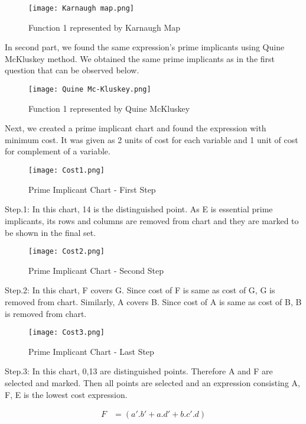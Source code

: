 \documentclass[pdftex,12pt,a4paper]{article}
\begin{document}
\begin{figure}[ht]
	\centering
	\texttt{[image: Karnaugh map.png]}
	\caption{Function 1 represented by Karnaugh Map}
	\label{fig1}
\end{figure}

In second part, we found the same expression's prime implicants using Quine McKluskey method. We obtained the same prime implicants as in the first question that can be observed below.

\begin{figure}[ht]
	\centering
	\texttt{[image: Quine Mc-Kluskey.png]}
	\caption{Function 1 represented by Quine McKluskey}
	\label{fig1}
\end{figure}

Next, we created a prime implicant chart and found the expression with minimum cost. It was given as 2 units of cost for each variable and 1 unit of cost for complement of a variable. 

\begin{figure}[ht]
	\centering
	\texttt{[image: Cost1.png]}
	\caption{Prime Implicant Chart - First Step}
	\label{fig1}
\end{figure}

Step.1: In this chart, 14 is the distinguished point. As E is essential prime implicants, its rows and columns are removed from chart and they are marked to be shown in the final set.

\begin{figure}[ht]
	\centering
	\texttt{[image: Cost2.png]}
	\caption{Prime Implicant Chart - Second Step}
	\label{fig1}
\end{figure}
Step.2: In this chart, F covers G. Since cost of F is same as cost of G, G is removed from chart. Similarly, A covers B. Since cost of A is same as cost of B, B is removed from chart.
\begin{figure}[ht]
	\centering
	\texttt{[image: Cost3.png]}
	\caption{Prime Implicant Chart - Last Step}
	\label{fig1}
\end{figure}
Step.3: In this chart, 0,13 are distinguished points. Therefore A and F are selected and marked. Then all points are selected and an expression consisting A, F, E is the lowest cost expression.

\begin{align*}
F &=  ( a'.b'+ a.d' +b.c'.d) \\
\end{align*}
\end{document}
